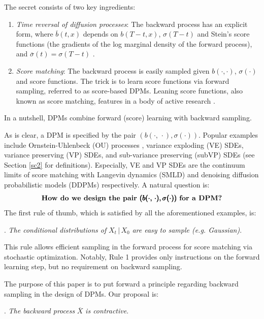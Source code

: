 \documentclass[letterpaper,11pt,reqno]{amsart}
\numberwithin{equation}{section}
\begin{document}
The secret consists of two key ingredients:
\begin{enumerate}[itemsep = 3 pt]
\item
{\em Time reversal of diffusion processes}:
The backward process has an explicit form,
where $\overline{b}(t,x)$ depends on $b(T-t,x)$, $\sigma(T-t)$ and Stein's score functions
(the gradients of the log marginal density of the forward process),
and $\overline{\sigma}(t)=\sigma(T-t)$ \cite{HP86, CCGL21}.
\item
{\em Score matching}: The backward process is easily sampled 
given $b(\cdot,\cdot)$, $\sigma(\cdot)$ and score functions.
The trick is to learn score functions via forward sampling,
referred to as score-based DPMs.
Leaning score functions, also known as score matching,
features in a body of active research
\cite{Hyv05, Vi11, Song20sl, Koe22}.
\end{enumerate}
In a nutshell, DPMs combine forward (score) learning with backward sampling.

\quad As is clear, a DPM is specified by the pair $(b(\cdot, \, \cdot),  \sigma(\cdot))$.
Popular examples include
Ornstein-Uhlenbeck (OU) processes \cite{DV21},
variance exploding (VE) SDEs,
variance preserving (VP) SDEs,
and sub-variance preserving (subVP) SDEs \cite{Song20} (see Section \ref{sc2} for definitions).
Especially, 
VE and VP SDEs are the continuum limits of 
score matching with Langevin dynamics (SMLD) \cite{Song19}
and denoising diffusion probabilistic models (DDPMs) \cite{Ho20} respectively.
A natural question is:
\begin{equation*}
\mbox{\bf How do we design the pair } \pmb{(b(\cdot, \, \cdot),  \sigma(\cdot))} \mbox{ \bf for a DPM?}
\end{equation*}
The first rule of thumb, which is satisfied by all the aforementioned examples,  is:

\smallskip
\noindent
{}. {\em The conditional distributions of} $X_t \,|\, X_0$ {\em are easy to sample (e.g. Gaussian)}.

This rule allows efficient sampling in the forward process
for score matching via stochastic optimization.
Notably, Rule 1 provides only instructions on the forward learning step,
but no requirement on backward sampling. 

\quad The purpose of this paper is to put forward a principle regarding backward sampling
in the design of DPMs.
Our proposal is:

\smallskip
\noindent
{}. {\em The backward process } $\overline{X}$ {\em is contractive}.
\end{document}
